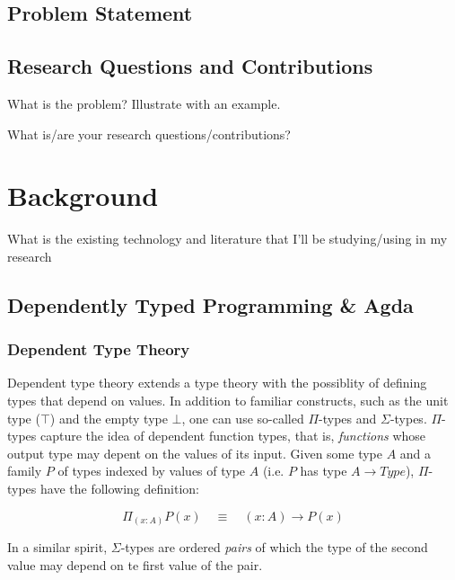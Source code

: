 \documentclass[11pt]{article}
\begin{document}
\subsection{Problem Statement}

\subsection{Research Questions and Contributions}

What is the problem? Illustrate with an example. \cite{runciman2008smallcheck, altenkirch2003generic}

What is/are your research questions/contributions? \cite{claessen2011quickcheck}

\section{Background}

What is the existing technology and literature that I'll be
studying/using in my research \cite{denes2014quickchick, yorgey2010species, loh2011generic, norell2008dependently}

\subsection{Dependently Typed Programming \& Agda}

\subsubsection{Dependent Type Theory}

Dependent type theory extends a type theory with the possiblity of defining types that depend on values. In addition to familiar constructs, such as the unit type ($\top$) and the empty type $\bot$, one can use so-called $\Pi$-types and $\Sigma$-types. $\Pi$-types capture the idea of dependent function types, that is, \textit{functions} whose output type may depent on the values of its input. Given some type $A$ and a family $P$ of types indexed by values of type $A$ (i.e. $P$ has type $A \rightarrow Type$), $\Pi$-types have the following definition: 

\begin{equation*}
\Pi_{(x : A)} P(x) \quad \equiv \quad (x : A) \rightarrow P(x) 
\end{equation*}

In a similar spirit, $\Sigma$-types are ordered \textit{pairs} of which the type of the second value may depend on te first value of the pair. 
\end{document}
